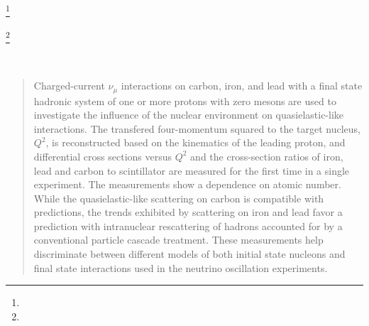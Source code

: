 \documentclass[aps,prl,preprint,showpacs,superscriptaddress,nofootinbib,linenumbers]{revtex4}
\newcommand{\minerva}{MINERvA\xspace}
\begin{document}
\author{J.K.~Nelson}                      \affiliation{\WM}
\author{A.~Norrick}                       \affiliation{\WM}
\author{Nuruzzaman}                       \affiliation{\Rutgers}  \affiliation{\USM}
\author{C.E.~Patrick}                     \affiliation{\Northwestern}
\author{G.N.~Perdue}                      \affiliation{\FNAL}  \affiliation{\Rochester}
\author{M.A.~Ram\'{i}rez}                 \affiliation{\Guanajuato}
\author{L.~Ren}                           \affiliation{\Pittsburgh}
\author{D.~Rimal}                         \affiliation{\Florida}
\author{P.A.~Rodrigues}                   \affiliation{\umiss}  \affiliation{\Rochester}
\author{D.~Ruterbories}                   \affiliation{\Rochester}
\author{H.~Schellman}                     \affiliation{\OregonState}  \affiliation{\Northwestern}
\author{J.T.~Sobczyk}                     \affiliation{\wroclaw}
\author{C.J.~Solano~Salinas}              \affiliation{\UNI}
\author{S.~S\'{a}nchez~Falero}            \affiliation{\PUCP}
\author{E.~Valencia}                      \affiliation{\WM}  \affiliation{\Guanajuato}
\author{T.~Walton}\thanks{\twaltonThanks}  \affiliation{\Hampton}
\author{J.~Wolcott}\thanks{\jwolcottThanks}  \affiliation{\Rochester}
\author{M.Wospakrik}                      \affiliation{\Florida}
\author{B.~Yaeggy}                        \affiliation{\USM}

\collaboration{The \minerva  Collaboration}\ \noaffiliation

\date{\today}



\begin{abstract}
Charged-current $\nu_{\mu}$ interactions on carbon, iron, and lead with a final state hadronic system of one or more protons with zero mesons are used to investigate the influence of the nuclear environment on quasielastic-like interactions.    The transfered four-momentum squared to the target nucleus, $Q^2$,  is reconstructed based on the kinematics of the leading proton, and differential cross sections versus $Q^2$ and the cross-section ratios of iron, lead and carbon to scintillator are measured for the first time in a single experiment. The measurements show a dependence on atomic number.  While the quasielastic-like scattering on carbon is compatible with predictions, the trends exhibited by scattering on iron and lead favor a prediction with intranuclear rescattering of hadrons accounted for by a conventional particle cascade treatment. These measurements help discriminate between different models of both initial state nucleons and final state interactions used in the neutrino oscillation experiments.

\end{abstract}
\end{document}

